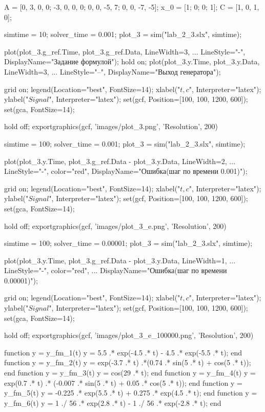 
\begin{matlabcode}
A = [0, 3, 0, 0;
     -3, 0, 0, 0;
      0, 0, -5, 7;
      0, 0, -7, -5];
x_0 = [1; 0; 0; 1];
C = [1, 0, 1, 0];

simtime = 10;
solver_time = 0.001;
plot_3 = sim("lab_2_3.slx", simtime);

plot(plot_3.g_ref.Time, plot_3.g_ref.Data, LineWidth=3, ...
    LineStyle="-", DisplayName="Задание формулой");
hold on;
plot(plot_3.y.Time, plot_3.y.Data, LineWidth=3, ...
    LineStyle="--", DisplayName="Выход генератора");

grid on;
legend(Location="best", FontSize=14);
xlabel("$t, c$", Interpreter="latex");
ylabel("$Signal$", Interpreter="latex");
set(gcf, Position=[100, 100, 1200, 600]);   
set(gca, FontSize=14);

hold off;
exportgraphics(gcf, 'images/plot_3.png', 'Resolution', 200)
\end{matlabcode}

\begin{matlabcode}
simtime = 100;
solver_time = 0.001;
plot_3 = sim("lab_2_3.slx", simtime);

plot(plot_3.y.Time, plot_3.g_ref.Data - plot_3.y.Data, LineWidth=2, ...
    LineStyle="-", color="red", DisplayName="Ошибка(шаг по времени 0.001)");

grid on;
legend(Location="best", FontSize=14);
xlabel("$t, c$", Interpreter="latex");
ylabel("$Signal$", Interpreter="latex");
set(gcf, Position=[100, 100, 1200, 600]);   
set(gca, FontSize=14);

hold off;
exportgraphics(gcf, 'images/plot_3_e.png', 'Resolution', 200)
\end{matlabcode}

\begin{matlabcode}
simtime = 100;
solver_time = 0.00001;
plot_3 = sim("lab_2_3.slx", simtime);

plot(plot_3.y.Time, plot_3.g_ref.Data - plot_3.y.Data, LineWidth=1, ...
    LineStyle="-", color="red", ...
        DisplayName="Ошибка(шаг по времени 0.00001)");

grid on;
legend(Location="best", FontSize=14);
xlabel("$t, c$", Interpreter="latex");
ylabel("$Signal$", Interpreter="latex");
set(gcf, Position=[100, 100, 1200, 600]);   
set(gca, FontSize=14);

hold off;
exportgraphics(gcf, 'images/plot_3_e_100000.png', 'Resolution', 200)
\end{matlabcode}


\begin{matlabcode}
function y = y_fm_1(t)
    y = 5.5 .* exp(-4.5 .* t) - 4.5 .* exp(-5.5 .* t);
end
function y = y_fm_2(t)
    y = exp(-3.7 .* t) .*(0.74 .* sin(5 .* t) + cos(5 .* t));
end
function y = y_fm_3(t)
    y = cos(29 .* t);
end
function y = y_fm_4(t)
    y = exp(0.7 .* t) .* (-0.007 .* sin(5 .* t) + 0.05 .* cos(5 .* t));
end
function y = y_fm_5(t)
    y = -0.225 .* exp(5.5 .* t) + 0.275 .* exp(4.5 .* t);
end
function y = y_fm_6(t)
    y = 1 ./ 56 .* exp(2.8 .* t) - 1 ./ 56 .* exp(-2.8 .* t);
end
\end{matlabcode}
